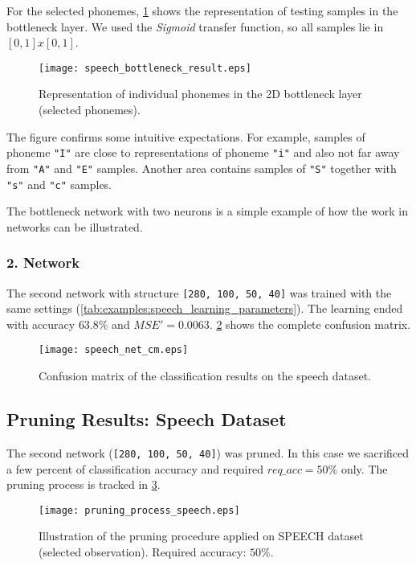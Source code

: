 For the selected phonemes, \cref{fig:examples:speech_bottleneck_result} shows the representation of testing samples in the bottleneck layer. We used the \textit{Sigmoid} transfer function, so all samples lie in $ [0,1] x [0,1] $.

\begin{figure}[H]
\centering
\texttt{[image: speech\_bottleneck\_result.eps]}
\caption{Representation of individual phonemes in the 2D bottleneck layer (selected phonemes).}
\label{fig:examples:speech_bottleneck_result}
\end{figure}

The figure confirms some intuitive expectations. For example, samples of phoneme \texttt{"I"} are close to representations of phoneme \texttt{"i"} and also not far away from \texttt{"A"} and \texttt{"E"} samples. Another area contains samples of \texttt{"S"} together with \texttt{"s"} and \texttt{"c"} samples.

The bottleneck network with two neurons is a simple example of how the work in networks can be illustrated.

\subsubsection*{2. Network}
The second network with structure \texttt{[280, 100, 50, 40]} was trained with the same settings (\cref{tab:examples:speech_learning_parameters}). The learning ended with accuracy $ 63.8\% $ and $ MSE' = 0.0063 $. \cref{fig:examples:speech_net_cm} shows the complete confusion matrix.

\begin{figure}[H]
\centering
\texttt{[image: speech\_net\_cm.eps]}
\caption{Confusion matrix of the classification results on the speech dataset.}
\label{fig:examples:speech_net_cm}
\end{figure}

\subsection*{Pruning Results: Speech Dataset}
The second network (\texttt{[280, 100, 50, 40]}) was pruned. In this case we sacrificed a few percent of classification accuracy and required $ req\_acc = 50\% $ only. The pruning process is tracked in \cref{fig:examples:speech_pruning_process}.

\begin{figure}[H]
\centering
\texttt{[image: pruning\_process\_speech.eps]}
\caption{Illustration of the pruning procedure applied on SPEECH dataset (selected observation). Required accuracy: $ 50\% $.}
\label{fig:examples:speech_pruning_process}
\end{figure}

